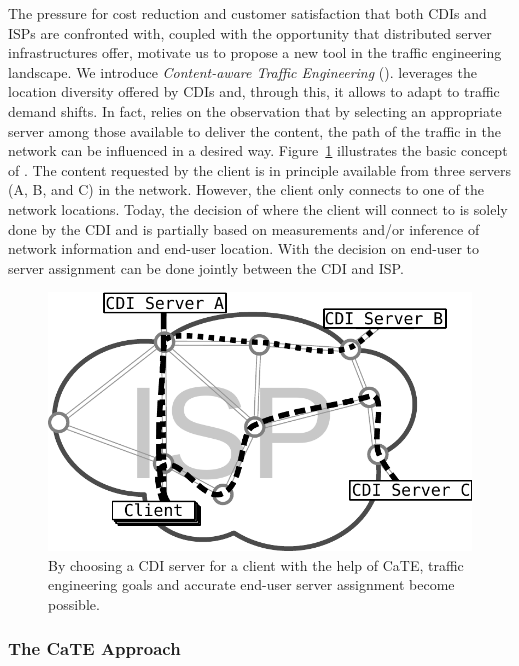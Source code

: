 The pressure for cost reduction and customer satisfaction that both CDIs and
ISPs are confronted with, coupled with the opportunity that distributed server
infrastructures offer, motivate us to propose a new tool in the traffic
engineering landscape. We introduce \emph{Content-aware Traffic Engineering}
(\cate). \cate leverages the location diversity offered by CDIs and, through
this, it allows to adapt to traffic demand shifts. In fact, \cate relies on the
observation that by selecting an appropriate server among those available to
deliver the content, the path of the traffic in the network can be influenced
in a desired way. Figure~\ref{fig:flowSelection} illustrates the basic concept
of \cate. The content requested by the client is in principle available from
three servers (A, B, and C) in the network. However, the client only connects
to one of the network locations. Today, the decision of where the client will
connect to is solely done by the CDI and is partially based on measurements
and/or inference of network information and end-user location. With \cate the
decision on end-user to server assignment can be done jointly between the CDI
and ISP.

\begin{figure}[tbp]
  \center\includegraphics[width=0.8\linewidth]{figures-pdf/trafficShift-concept}
  \caption{By choosing a CDI server for a client with the help of CaTE, traffic
  engineering goals and accurate end-user server assignment become possible.}
  \label{fig:flowSelection}
  \vspace{-1.5em}
\end{figure}


\subsubsection{The CaTE Approach}\label{sec:cate}

